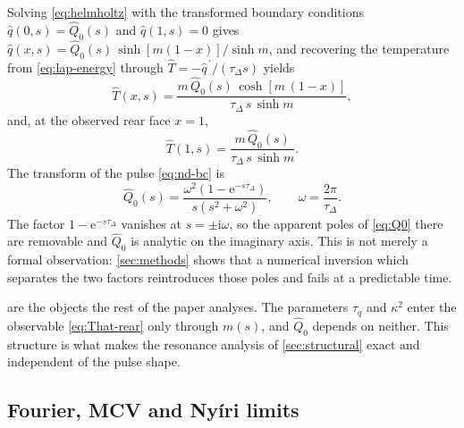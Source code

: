 \documentclass[preprint,12pt,a4paper]{elsarticle}
\theoremstyle{plain}
\theoremstyle{definition}
\theoremstyle{remark}
\newcommand{\tq}{\tau_{q}}
\newcommand{\kk}{\kappa^{2}}
\begin{document}
Solving \eqref{eq:helmholtz} with the transformed boundary conditions
$\hat{q}(0,s) = \hat{Q}_{0}(s)$ and $\hat{q}(1,s) = 0$ gives
$\hat{q}(x,s) = \hat{Q}_{0}(s)\,\sinh\!\left[m(1-x)\right]/\sinh m$, and
recovering the temperature from \eqref{eq:lap-energy} through
$\hat{T} = -\hat{q}^{\,\prime}/(\tau_{\Delta} s)$ yields
%
\begin{equation}
  \hat{T}(x,s)
  = \frac{m\,\hat{Q}_{0}(s)\,\cosh\!\left[m\,(1-x)\right]}
         {\tau_{\Delta}\, s\, \sinh m } ,
  \label{eq:That}
\end{equation}
%
and, at the observed rear face $x=1$,
%
\begin{equation}
  \hat{T}(1,s)
  = \frac{m\,\hat{Q}_{0}(s)}
         {\tau_{\Delta}\, s\, \sinh m } .
  \label{eq:That-rear}
\end{equation}
%
The transform of the pulse \eqref{eq:nd-bc} is
%
\begin{equation}
  \hat{Q}_{0}(s)
  = \frac{\omega^{2}\left(1 - \mathrm{e}^{-s\tau_{\Delta}}\right)}
         {s\left(s^{2} + \omega^{2}\right)} ,
  \qquad \omega = \frac{2\pi}{\tau_{\Delta}} .
  \label{eq:Q0}
\end{equation}
%
The factor $1 - \mathrm{e}^{-s\tau_{\Delta}}$ vanishes at $s = \pm\mathrm{i}
\omega$, so the apparent poles of \eqref{eq:Q0} there are removable and
$\hat{Q}_{0}$ is analytic on the imaginary axis. This is not merely a formal
observation: \cref{sec:methods} shows that a numerical inversion which
separates the two factors reintroduces those poles and fails at a predictable
time.

 are the objects the rest of the paper
analyses. The parameters $\tq$ and $\kk$ enter the observable
\eqref{eq:That-rear} only through $m(s)$, and $\hat{Q}_{0}$ depends on neither.
This structure is what makes the resonance analysis of \cref{sec:structural}
exact and independent of the pulse shape.

\subsection{Fourier, MCV and Nyíri limits}
\label{sec:model-limits}
\end{document}
